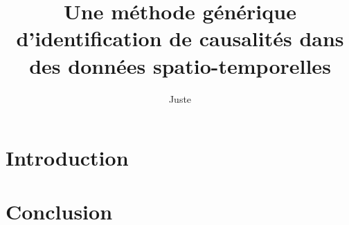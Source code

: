 \documentclass[french]{./sageo}
\title{Une méthode générique d'identification de causalités dans des données spatio-temporelles}
\author[1,2]{Juste}{Raimbault}
\begin{document}
\maketitle

\newpage




\section{Introduction}









\section{Conclusion}





%







\end{document}
